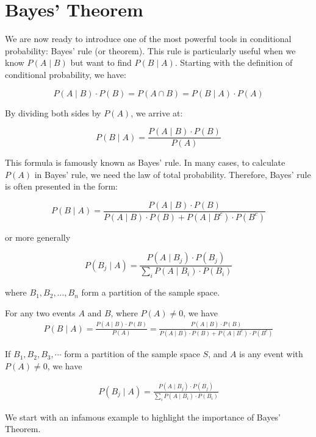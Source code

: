 \section{Bayes' Theorem}
\label{sec:bayes-theorem}
We are now ready to introduce one of the most powerful tools in conditional probability: Bayes' rule (or theorem). This rule is particularly useful when we know \( P(A \mid B) \) but want to find \( P(B \mid A) \). Starting with the definition of conditional probability, we have:

\[
P(A \mid B) \cdot P(B) = P(A \cap B) = P(B \mid A) \cdot P(A)
\]

By dividing both sides by \( P(A) \), we arrive at:

\[
P(B \mid A) = \frac{P(A \mid B) \cdot P(B)}{P(A)}
\]

This formula is famously known as Bayes' rule. In many cases, to calculate \( P(A) \) in Bayes' rule, we need the law of total probability. Therefore, Bayes' rule is often presented in the form:

\[
P(B \mid A) = \frac{P(A \mid B) \cdot P(B)}{P(A \mid B) \cdot P(B) + P(A \mid B^c) \cdot P(B^c)}
\]

or more generally

\[
P\left(B_j \mid A\right) = \frac{P\left(A \mid B_j\right) \cdot P\left(B_j\right)}{\sum_i P\left(A \mid B_i\right) \cdot P\left(B_i\right)}
\]

where \( B_1, B_2, \ldots, B_n \) form a partition of the sample space.

\begin{theorem}
    For any two events $A$ and $B$, where $P(A) \neq 0$, we have
    \begin{align*}
    P(B \mid A) = \frac{P(A \mid B) \cdot P(B)}{P(A)}
     = \frac{P(A \mid B) \cdot P(B)}{P(A \mid B) \cdot P(B) + P(A \mid B^c) \cdot P(B^c)}
    \end{align*}

    If $B_1, B_2, B_3, \cdots$ form a partition of the sample space $S$, and $A$ is any event with $P(A) \neq 0$, we have

    \begin{align*}
    P\left(B_j \mid A\right) = \frac{P\left(A \mid B_j\right) \cdot P\left(B_j\right)}{\sum_i P\left(A \mid B_i\right) \cdot P\left(B_i\right)}
    \end{align*}
\end{theorem}

We start with an infamous example to highlight the importance of Bayes' Theorem.

